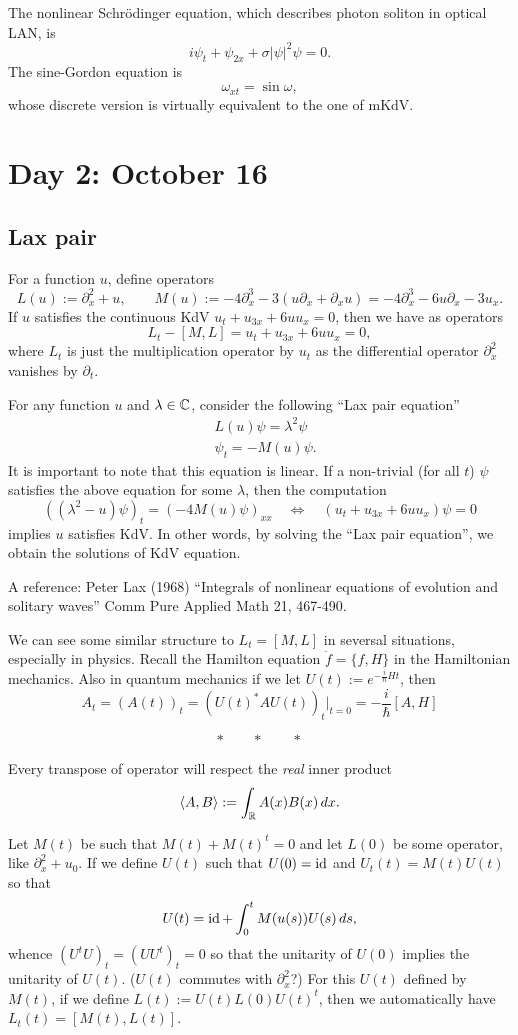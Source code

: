 \documentclass{../../../small}
\begin{document}
The nonlinear Schr\"odinger equation, which describes photon soliton in optical LAN, is
\[i\psi_t+\psi_{2x}+\sigma|\psi|^2\psi=0.\]
The sine-Gordon equation is
\[\omega_{xt}=\sin\omega,\]
whose discrete version is virtually equivalent to the one of mKdV.

\newpage
\section{Day 2: October 16}
\subsection*{Lax pair}
For a function $u$, define operators
\[L(u):=\partial_x^2+u,\qquad M(u):=-4\partial_x^3-3(u\partial_x+\partial_xu)=-4\partial_x^3-6u\partial_x-3u_x.\]
If $u$ satisfies the continuous KdV $u_t+u_{3x}+6uu_x=0$, then we have as operators
\[L_t-[M,L]=u_t+u_{3x}+6uu_x=0,\]
where $L_t$ is just the multiplication operator by $u_t$ as the differential operator $\partial_x^2$ vanishes by $\partial_t$.

For any function $u$ and $\lambda\in\mathbb{C}$, consider the following ``Lax pair equation''
\begin{align*}
&L(u)\psi=\lambda^2\psi\\
&\psi_t=-M(u)\psi.
\end{align*}
It is important to note that this equation is linear.
If a non-trivial (for all $t$) $\psi$ satisfies the above equation for some $\lambda$, then the computation
\[((\lambda^2-u)\psi)_t=(-4M(u)\psi)_{xx}\quad\Leftrightarrow\quad(u_t+u_{3x}+6uu_x)\psi=0\]
implies $u$ satisfies KdV.
In other words, by solving the ``Lax pair equation'', we obtain the solutions of KdV equation.

A reference: Peter Lax (1968) ``Integrals of nonlinear equations of evolution and solitary waves'' Comm Pure Applied Math 21, 467-490.

We can see some similar structure to $L_t=[M,L]$ in seversal situations, especially in physics.
Recall the Hamilton equation $\dot f=\{f,H\}$ in the Hamiltonian mechanics.
Also in quantum mechanics if we let $U(t):=e^{-\frac i\hbar Ht}$, then
\[A_t=(A(t))_t=(U(t)^*AU(t))_t|_{t=0}=-\frac i\hbar[A,H]\]

\[*\qquad*\qquad*\]
\smallskip

Every transpose of operator will respect the \emph{real} inner product
\[\langle A,B\rangle:=\int_{\mathbb{R}} A(x)B(x)\,dx.\]

Let $M(t)$ be such that $M(t)+M(t)^t=0$ and let $L(0)$ be some operator, like $\partial_x^2+u_0$.
If we define $U(t)$ such that $U(0)=\operatorname{id}$ and $U_t(t)=M(t)U(t)$ so that
\[U(t)=\operatorname{id}+\int_0^tM(u(s))U(s)\,ds,\]
whence $(U^tU)_t=(UU^t)_t=0$ so that the unitarity of $U(0)$ implies the unitarity of $U(t)$.
($U(t)$ commutes with $\partial_x^2$?)
For this $U(t)$ defined by $M(t)$, if we define $L(t):=U(t)L(0)U(t)^t$, then we automatically have $L_t(t)=[M(t),L(t)]$.
\end{document}
